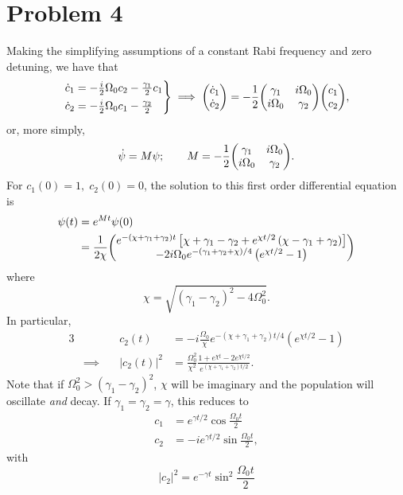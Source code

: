 \documentclass[12pt]{article}
\newcommand{\magsq}[1]{\big|#1\big|^2}
\begin{document}
\section*{Problem 4}
Making the simplifying assumptions of a constant Rabi frequency and zero detuning, we have that
\begin{equation*}
    \begin{rcases*}
        \dot{c}_1 = -\frac{i}{2}\Omega_0c_2 -\frac{\gamma_1}{2}c_1 \\
        \dot{c}_2 = -\frac{i}{2}\Omega_0c_1 - \frac{\gamma_2}{2}
    \end{rcases*}
    \implies \mqty(\dot{c}_1\\\dot{c}_2) = -\frac{1}{2}\mqty(\gamma_1&i\Omega_0\\i\Omega_0&\gamma_2)\mqty(c_1\\c_2),
\end{equation*}
or, more simply,
\[ \dot{\psi} = M\psi; \qquad M = -\frac{1}{2}\mqty(\gamma_1&i\Omega_0\\i\Omega_0&\gamma_2). \]
For $c_1(0) = 1,\;c_2(0)=0$, the solution to this first order differential equation is
\begin{align*}
    \psi(t) &= e^{Mt}\psi(0) \\
    &= \frac{1}{2\chi} \mqty(e^{-(\chi + \gamma_1 + \gamma_2)t}\left[\chi + \gamma_1 - \gamma_2 + e^{\chi t/2}\left(\chi - \gamma_1 + \gamma_2\right)\right] \\ -2i\Omega_0e^{-(\gamma_1 + \gamma_2 + \chi)/4}\left(e^{\chi t/2} - 1\right) )
\end{align*}
where
\[ \chi = \sqrt{(\gamma_1 - \gamma_2)^2 - 4\Omega_0^2}. \]
In particular, 
\begin{alignat*}{3}
    & \quad & c_2(t) &= -i\frac{\Omega_0}{\chi}e^{-(\chi + \gamma_1 + \gamma_2)t/4}\left(e^{\chi t/2} - 1\right) \\
    &\implies\quad & \magsq{c_2(t)} &= \frac{\Omega_0^2}{\chi^2}\frac{1 + e^{\chi t} -2e^{\chi t/2}}{e^{(\chi + \gamma_1 + \gamma_2)t/2}}.
\end{alignat*}
Note that if $\Omega_0^2 > (\gamma_1-\gamma_2)^2$, $\chi$ will be imaginary and the population will oscillate \textit{and} decay.
If $\gamma_1 = \gamma_2 = \gamma$, this reduces to
\begin{align*}
    c_1 &= e^{\gamma t/2}\cos\frac{\Omega_0t}{2} \\
    c_2 &= -ie^{\gamma t/2}\sin\frac{\Omega_0t}{2},
\end{align*}
with
\[ \magsq{c_2} = e^{-\gamma t}\sin^2\frac{\Omega_0t}{2} \]


\end{document}
